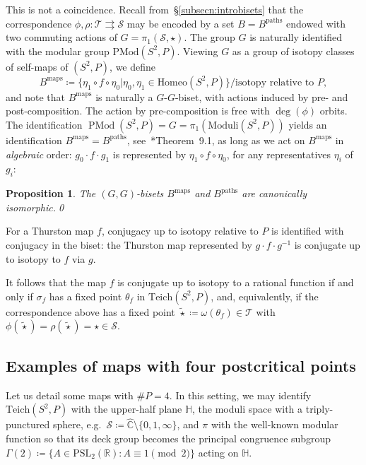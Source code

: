 \documentclass{amsart}
\newcommand\IH{{\mathbb{H}}}
\newcommand\C{{\mathbb{C}}}
\newcommand\R{{\mathbb{R}}}
\newcommand\Mod{{\operatorname{PMod}}}
\newcommand{\rs}{\widehat{\C}}
\newcommand{\Teich}{\text{Teich}}
\newcommand{\Moduli}{\text{Moduli}}
\newtheorem{prop}[thm]{Proposition}
\theoremstyle{definition}
\theoremstyle{remark}
\newcommand{\cT}{\mathcal{T}}
\newcommand{\cS}{\mathcal{S}}
\begin{document}
This is not a coincidence. Recall from~\S\ref{subsecn:introbisets} that the correspondence $\phi,\rho\colon\cT\rightrightarrows\cS$ may be encoded by a set $B=B^{\text{paths}}$ endowed with two commuting actions of $G=\pi_1(\cS,\star)$. The group $G$ is naturally identified with the modular group $\text{PMod}(S^2, P)$. Viewing $G$ as a group of isotopy classes of self-maps of $(S^2,P)$, we define
\[ B^{\text{maps}}\coloneqq\{\eta_1 \circ f \circ \eta_0 | \eta_0, \eta_1\in\text{Homeo}(S^2,P)\}/\text{isotopy relative to $P$},\]
and note that $B^{\text{maps}}$ is naturally a $G$-$G$-biset, with actions induced by pre- and post-composition. The action by pre-composition is free with $\deg(\phi)$ orbits. The identification $\Mod(S^2, P)=G=\pi_1(\Moduli(S^2,P))$ yields an identification $B^{\text{maps}}=B^{\text{paths}}$, see~\cite{MR4213769}*{Theorem~9.1}, as long as we act on $B^{\text{maps}}$ in \emph{algebraic} order: $g_0\cdot f\cdot g_1$ is represented by $\eta_1\circ f\circ\eta_0$, for any representatives $\eta_i$ of $g_i$:
\begin{prop}\label{prop:identify}
  The $(G,G)$-bisets $B^{\text{maps}}$ and $B^{\text{paths}}$ are canonically isomorphic.\qed
\end{prop}

For a Thurston map $f$, conjugacy up to isotopy relative to $P$ is identified with conjugacy in the biset: the Thurston map represented by $g \cdot f \cdot g^{-1}$ is conjugate up to isotopy to $f$ via $g$. 

It follows that the map $f$ is conjugate up to isotopy to a rational function if and only if $\sigma_f$ has a fixed point $\theta_f$ in $\Teich(S^2, P)$, and, equivalently, if the correspondence above has a fixed point $\tilde{\star}\coloneqq\omega(\theta_f)\in\cT$ with $\phi(\tilde\star)=\rho(\tilde\star)=\star\in\cS$.

\subsection{Examples of maps with four postcritical points}\label{secn:examples}
Let us detail some maps with $\#P=4$.  In this setting, we may identify $\Teich(S^2, P)$ with the upper-half plane $\IH$, the moduli space with a triply-punctured sphere, e.g.\ $\cS\coloneqq\rs \setminus \{0,1,\infty\}$, and $\pi$ with the well-known modular function so that its deck group becomes the principal congruence subgroup $\Gamma(2)\coloneqq\{ A\in \mathrm{PSL}_2(\R) : A \equiv 1 \pmod 2\}$ acting on $\IH$.
\end{document}
